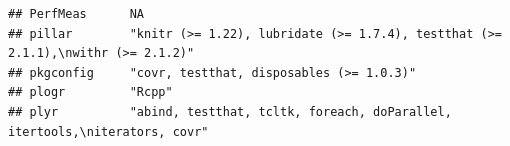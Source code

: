 \documentclass[]{article}
\begin{document}
\begin{verbatim}
## PerfMeas      NA                                                                                                                                                                                                                                                                                                                                                                                                                                                                                                                                                                                        
## pillar        "knitr (>= 1.22), lubridate (>= 1.7.4), testthat (>= 2.1.1),\nwithr (>= 2.1.2)"                                                                                                                                                                                                                                                                                                                                                                                                                                                                                                           
## pkgconfig     "covr, testthat, disposables (>= 1.0.3)"                                                                                                                                                                                                                                                                                                                                                                                                                                                                                                                                                  
## plogr         "Rcpp"                                                                                                                                                                                                                                                                                                                                                                                                                                                                                                                                                                                    
## plyr          "abind, testthat, tcltk, foreach, doParallel, itertools,\niterators, covr"                                                                                                                                                                                                                                                                                                                                                                                                                                                                                                                

\end{verbatim}
\end{document}
